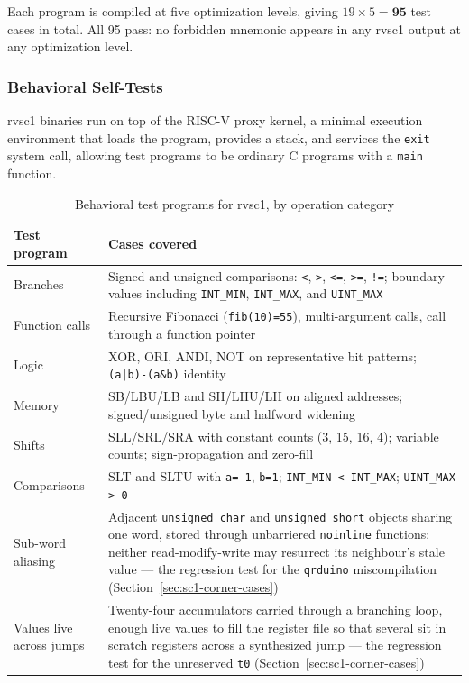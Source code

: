 Each program is compiled at five optimization levels, giving $19 \times 5 = \mathbf{95}$ test cases
in total. All 95 pass: no forbidden mnemonic appears in any rvsc1 output at any optimization level.

\subsubsection{Behavioral Self-Tests} \label{sec:sc1-behav-tests}

rvsc1 binaries run on top of the RISC-V proxy kernel, a minimal execution environment that loads the
program, provides a stack, and services the \texttt{exit} system call, allowing test programs to be
ordinary C programs with a \texttt{main} function.

\begin{table}[htb]
\centering
\caption{Behavioral test programs for rvsc1, by operation category}
\label{tab:sc1-behav-files}
\begin{tabular}{lp{9.4cm}}
\toprule
\textbf{Test program} & \textbf{Cases covered} \\
\midrule
Branches    & Signed and unsigned comparisons: \texttt{<}, \texttt{>}, \texttt{<=}, \texttt{>=}, \texttt{!=}; boundary values including \texttt{INT\_MIN}, \texttt{INT\_MAX}, and \texttt{UINT\_MAX} \\
Function calls & Recursive Fibonacci (\texttt{fib(10)=55}), multi-argument calls, call through a function pointer \\
Logic       & XOR, ORI, ANDI, NOT on representative bit patterns; \texttt{(a|b)-(a\&b)} identity \\
Memory      & SB/LBU/LB and SH/LHU/LH on aligned addresses; signed/unsigned byte and halfword widening \\
Shifts      & SLL/SRL/SRA with constant counts (3, 15, 16, 4); variable counts; sign-propagation and zero-fill \\
Comparisons & SLT and SLTU with \texttt{a=-1}, \texttt{b=1}; \texttt{INT\_MIN < INT\_MAX}; \texttt{UINT\_MAX > 0} \\
Sub-word aliasing & Adjacent \texttt{unsigned char} and \texttt{unsigned short} objects sharing one word, stored through unbarriered \texttt{noinline} functions: neither read-modify-write may resurrect its neighbour's stale value --- the regression test for the \texttt{qrduino} miscompilation (Section~\ref{sec:sc1-corner-cases}) \\
Values live across jumps & Twenty-four accumulators carried through a branching loop, enough live values to fill the register file so that several sit in scratch registers across a synthesized jump --- the regression test for the unreserved \texttt{t0} (Section~\ref{sec:sc1-corner-cases}) \\
\bottomrule
\end{tabular}
\end{table}

